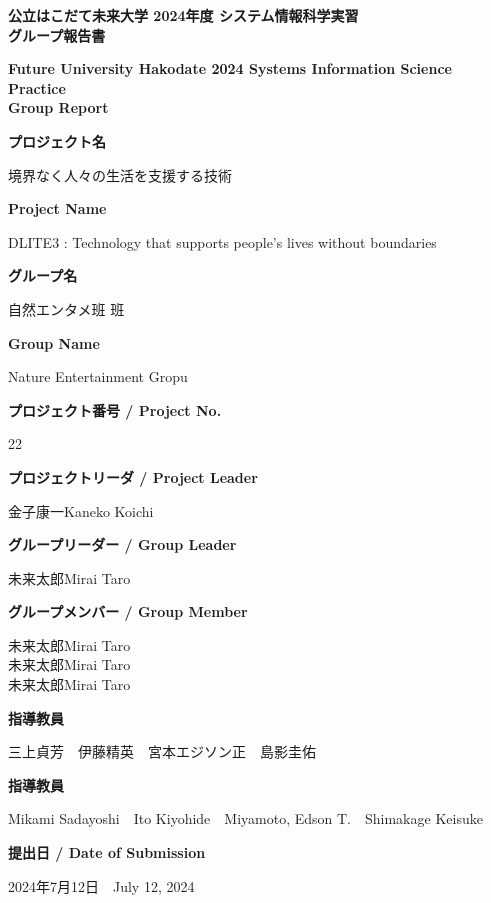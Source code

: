 \documentclass[12pt,a4paper]{report}
\newcommand{\AgendaBox}[2]{
    \large
    \textbf{#1}\\

    \vspace{0.2cm}

    \small 
    #2

    \vspace{0.5cm}
}
\newcommand{\NameBox}[2]{
    \small 
    #1\hspace{1cm}#2
}
\begin{document}
\thispagestyle{empty}
\begin{center}
    \large
    \textbf{
      公立はこだて未来大学 2024年度 システム情報科学実習\\
      グループ報告書
    }\\

    \vspace{0.2cm}

    \small 
    \textbf{
      Future University Hakodate 2024 Systems Information Science Practice\\Group Report
    }

    \vspace{0.5cm}

    \AgendaBox{プロジェクト名}{境界なく人々の生活を支援する技術}
    \AgendaBox{Project Name}{DLITE3 : Technology that supports people's lives without boundaries}
    \AgendaBox{グループ名}{自然エンタメ班 班}
    \AgendaBox{Group Name}{Nature Entertainment Gropu}
    \AgendaBox{プロジェクト番号 / Project No.}{22}
    \AgendaBox{プロジェクトリーダ / Project Leader}{金子康一\hspace{1cm}Kaneko Koichi}
    \AgendaBox{グループリーダー / Group Leader}{
      \NameBox{未来太郎}{Mirai Taro}\\
    }
    \AgendaBox{グループメンバー / Group Member}{
      \NameBox{未来太郎}{Mirai Taro}\\
      \NameBox{未来太郎}{Mirai Taro}\\
      \NameBox{未来太郎}{Mirai Taro}\\
    }
    \AgendaBox{指導教員}{
      三上貞芳　伊藤精英　宮本エジソン正　島影圭佑
    }
    \AgendaBox{指導教員}{
      Mikami Sadayoshi　Ito Kiyohide　Miyamoto, Edson T.　Shimakage Keisuke
    }
    \AgendaBox{提出日 / Date of Submission}{
      2024年7月12日　July 12, 2024
    }
    

\end{center}

\newpage
\thispagestyle{empty}
\mbox{}
\newpage

\clearpage
{}
\setcounter{page}{1}
\end{document}

